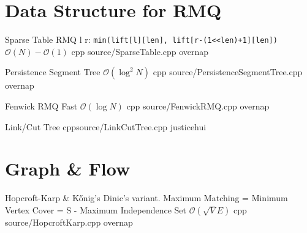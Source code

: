 \documentclass[landscape, 10pt, a4paper, oneside, twocolumn]{extarticle}
\begin{document}
\maketitlepage



\section{Data Structure for RMQ}


\Algorithm
{Sparse Table}
{RMQ l r: \texttt{min(lift[l][len], lift[r-(1<<len)+1][len])}}
{$\mathcal{O}(N)-\mathcal{O}(1)$}
{cpp}
{source/SparseTable.cpp}
{overnap}



\Algorithm
{Persistence Segment Tree}
{}
{$\mathcal{O}(\log^2{N})$}
{cpp}
{source/PersistenceSegmentTree.cpp}
{overnap}


\Algorithm
{Fenwick RMQ}
{}
{Fast $\mathcal{O}(\log{N})$}
{cpp}
{source/FenwickRMQ.cpp}
{overnap}


\Algorithm
{Link/Cut Tree}
{}
{}
{cpp}{source/LinkCutTree.cpp}
{justicehui}


\section{Graph \& Flow}


\Algorithm
{Hopcroft-Karp \& Kőnig's}
{Dinic's variant. Maximum Matching = Minimum Vertex Cover = S - Maximum Independence Set}
{$\mathcal{O}(\sqrt{V}E)$}
{cpp}
{source/HopcroftKarp.cpp}
{overnap}

\end{document}
